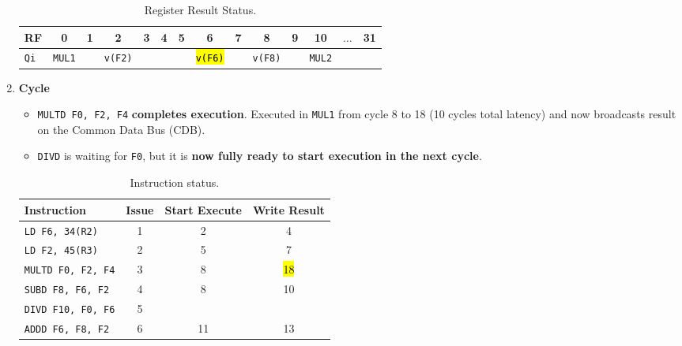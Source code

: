 \begin{enumerate}
    \begin{table}[!htp]
        \centering
        \begin{tabular}{@{} l | c c c c c c c c c c c c c @{}}
            \toprule
            RF              & 0                     & 1             & 2                     & 3             & 4             & 5             & 6                     & 7             & 8                     & 9             & 10                    & $\dots$           & 31            \\
            \midrule
            \texttt{Qi}     & \texttt{MUL1}         &               & \texttt{v(F2)}        &               &               &               & \hl{\texttt{v(F6)}}   &               & \texttt{v(F8)}        &               & \texttt{MUL2}         &                   &               \\
            \bottomrule
        \end{tabular}
        \caption*{Register Result Status.}
    \end{table}

    \newpage
    \setcounter{enumi}{17}


    \item \textbf{Cycle \theenumi}
    \begin{itemize}
        \item \texttt{MULTD F0, F2, F4} \textbf{completes execution}. Executed in \texttt{MUL1} from cycle 8 to 18 (10 cycles total latency) and now broadcasts result on the Common Data Bus (CDB).
        \item \texttt{DIVD} is waiting for \texttt{F0}, but it is \textbf{now fully ready to start execution in the next cycle}.
    \end{itemize}

    \begin{table}[!htp]
        \centering
        \begin{tabular}{@{} l | c c c @{}}
            \toprule
            Instruction                 & Issue & Start Execute & Write Result  \\
            \midrule
            \texttt{LD    F6, 34(R2)}   & 1     & 2             & 4             \\ [.3em]
            \texttt{LD    F2, 45(R3)}   & 2     & 5             & 7             \\ [.3em]
            \texttt{MULTD F0, F2, F4}   & 3     & 8             & \hl{18}       \\ [.3em]
            \texttt{SUBD  F8, F6, F2}   & 4     & 8             & 10            \\ [.3em]
            \texttt{DIVD  F10, F0, F6}  & 5     &               &               \\ [.3em]
            \texttt{ADDD  F6, F8, F2}   & 6     & 11            & 13            \\
            \bottomrule
        \end{tabular}
        \caption*{Instruction status.}
    \end{table}


\end{enumerate}
